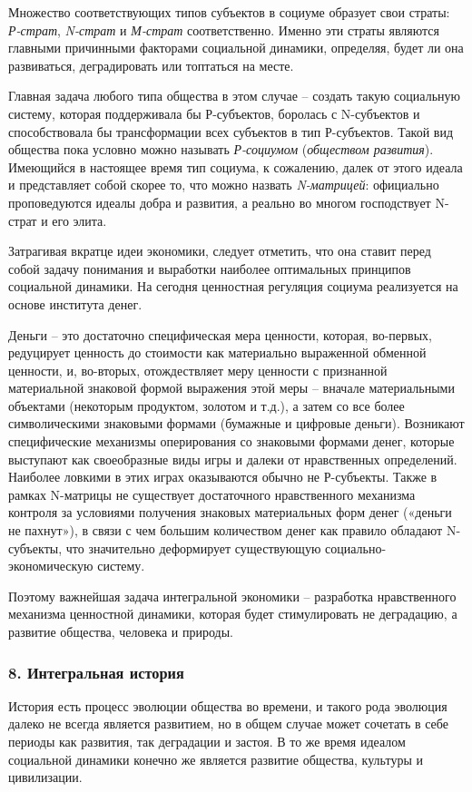     Множество соответствующих типов субъектов в социуме образует свои страты: \textit{Р-страт}, \textit{N-страт} и \textit{М-страт} соответственно. Именно эти страты являются главными причинными факторами социальной динамики, определяя, будет ли она развиваться, деградировать или топтаться на месте.

    Главная задача любого типа общества в этом случае – создать такую социальную систему, которая поддерживала бы Р-субъектов, боролась с N-субъектов и способствовала бы трансформации всех субъектов в тип Р-субъектов. Такой вид общества пока условно можно называть \textit{Р-социумом} (\textit{обществом развития}). Имеющийся в настоящее время тип социума, к сожалению, далек от этого идеала и представляет собой скорее то, что можно назвать \textit{N-матрицей}: официально проповедуются идеалы добра и развития, а реально во многом господствует N-страт и его элита.

    Затрагивая вкратце идеи экономики, следует отметить, что она ставит перед собой задачу понимания и выработки наиболее оптимальных принципов социальной динамики. На сегодня ценностная регуляция социума реализуется на основе института денег.

    Деньги – это достаточно специфическая мера ценности, которая, во-первых, редуцирует ценность до стоимости как материально выраженной обменной ценности, и, во-вторых, отождествляет меру ценности с признанной материальной знаковой формой выражения этой меры – вначале материальными объектами (некоторым продуктом, золотом и т.д.), а затем со все более символическими знаковыми формами (бумажные и цифровые деньги). Возникают специфические механизмы оперирования со знаковыми формами денег, которые выступают как своеобразные виды игры и далеки от нравственных определений. Наиболее ловкими в этих играх оказываются обычно не Р-субъекты. Также в рамках N-матрицы не существует достаточного нравственного механизма контроля за условиями получения знаковых материальных форм денег («деньги не пахнут»), в связи с чем большим количеством денег как правило обладают N-субъекты, что значительно деформирует существующую социально-экономическую систему.

    Поэтому важнейшая задача интегральной экономики – разработка нравственного механизма ценностной динамики, которая будет стимулировать не деградацию, а развитие общества, человека и природы.

    \subsubsection*{8. Интегральная история}
    История есть процесс эволюции общества во времени, и такого рода эволюция далеко не всегда является развитием, но в общем случае может сочетать в себе периоды как развития, так деградации и застоя. В то же время идеалом социальной динамики конечно же является развитие общества, культуры и цивилизации.

